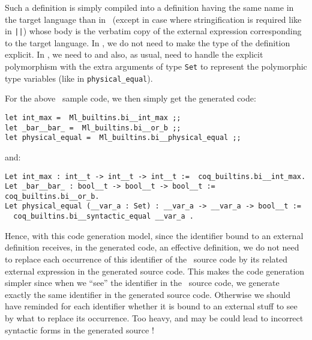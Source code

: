 Such a definition is simply compiled into a definition having the same
name in the target language than in \focalize\ (except in case where
stringification is required like in {\tt ||}) whose body is the
verbatim copy of the external expression corresponding to the target
language. In \ocaml, we do not need to make the type of the definition
explicit. In \coq, we need to and also, as usual, need to handle the
explicit polymorphism with the extra arguments of type {\tt Set} to
represent the polymorphic type variables (like in
{\tt physical\_equal}).

For the above \focalize\ sample code, we then simply get the generated
code:

{\footnotesize
\begin{lstlisting}[language=MyOCaml,
                   title=\ocaml\ code for external value definitions]
let int_max =  Ml_builtins.bi__int_max ;;
let _bar__bar_ =  Ml_builtins.bi__or_b ;;
let physical_equal =  Ml_builtins.bi__physical_equal ;;
\end{lstlisting}
}
and:

{\footnotesize
\begin{lstlisting}[language=MyCoq,
                   title=\coq code for external value definitions]
Let int_max : int__t -> int__t -> int__t :=  coq_builtins.bi__int_max.
Let _bar__bar_ : bool__t -> bool__t -> bool__t := coq_builtins.bi__or_b.
Let physical_equal (__var_a : Set) : __var_a -> __var_a -> bool__t :=
  coq_builtins.bi__syntactic_equal __var_a .
\end{lstlisting}
}

Hence, with this code generation model, since the identifier bound to
an external definition receives, in the generated code, an effective
definition, we do not need to replace each occurrence of this
identifier of the \focalize\ source code by its related external
expression in the generated source code. This makes the code
generation simpler since when we ``see'' the identifier in the
\focalize\ source code, we generate exactly the same identifier in the
generated source code. Otherwise we should have reminded for each
identifier whether it is bound to an external stuff to see by what to
replace its occurrence. Too heavy, and may be could lead to incorrect
syntactic forms in the generated source !
